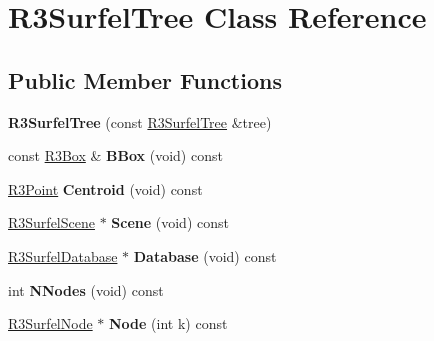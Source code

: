 \hypertarget{class_r3_surfel_tree}{}\section{R3\+Surfel\+Tree Class Reference}
\label{class_r3_surfel_tree}
\subsection*{Public Member Functions}
\begin{DoxyCompactItemize}
\item 
{\bfseries R3\+Surfel\+Tree} (const \hyperlink{class_r3_surfel_tree}{R3\+Surfel\+Tree} \&tree)\hypertarget{class_r3_surfel_tree_a7abf4ad60b589900e60f5f0adc052e30}{}\label{class_r3_surfel_tree_a7abf4ad60b589900e60f5f0adc052e30}

\item 
const \hyperlink{class_r3_box}{R3\+Box} \& {\bfseries B\+Box} (void) const \hypertarget{class_r3_surfel_tree_a08548aa7a55b2dd6cdb2e2c9757c99de}{}\label{class_r3_surfel_tree_a08548aa7a55b2dd6cdb2e2c9757c99de}

\item 
\hyperlink{class_r3_point}{R3\+Point} {\bfseries Centroid} (void) const \hypertarget{class_r3_surfel_tree_abbc3acf02bde5a36a77752f3d87bd815}{}\label{class_r3_surfel_tree_abbc3acf02bde5a36a77752f3d87bd815}

\item 
\hyperlink{class_r3_surfel_scene}{R3\+Surfel\+Scene} $\ast$ {\bfseries Scene} (void) const \hypertarget{class_r3_surfel_tree_a890e7c978b7d0417d6dd16ba6240faba}{}\label{class_r3_surfel_tree_a890e7c978b7d0417d6dd16ba6240faba}

\item 
\hyperlink{class_r3_surfel_database}{R3\+Surfel\+Database} $\ast$ {\bfseries Database} (void) const \hypertarget{class_r3_surfel_tree_a316092d2afa7f30c5cc2abfeee39e297}{}\label{class_r3_surfel_tree_a316092d2afa7f30c5cc2abfeee39e297}

\item 
int {\bfseries N\+Nodes} (void) const \hypertarget{class_r3_surfel_tree_a4940feeccae7de6e760523a4de5c52a3}{}\label{class_r3_surfel_tree_a4940feeccae7de6e760523a4de5c52a3}

\item 
\hyperlink{class_r3_surfel_node}{R3\+Surfel\+Node} $\ast$ {\bfseries Node} (int k) const \hypertarget{class_r3_surfel_tree_ad52c8552b2ec4fc4e58ec59112fef51e}{}\label{class_r3_surfel_tree_ad52c8552b2ec4fc4e58ec59112fef51e}


\end{DoxyCompactItemize}
